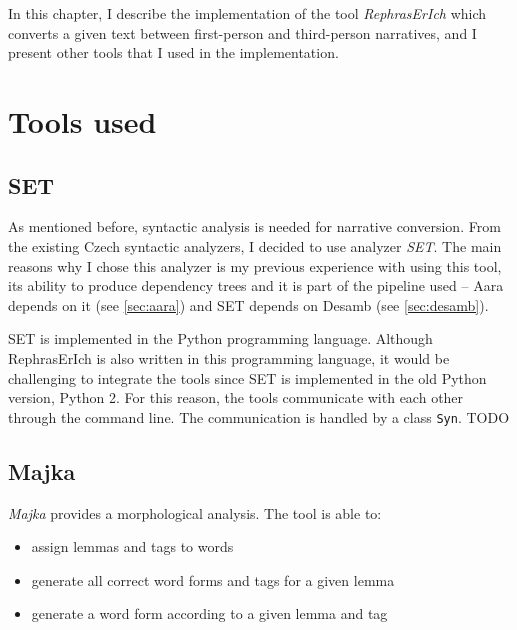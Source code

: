 In this chapter, I describe the implementation of the tool \emph{RephrasErIch} which converts a given text between first-person and third-person narratives, and I present other tools that I used in the implementation.

\section{Tools used} \label{sec:external-tools}

\subsection{SET}

As mentioned before, syntactic analysis is needed for narrative conversion. From the existing Czech syntactic analyzers, I decided to use analyzer \emph{SET}. The main reasons why I chose this analyzer is my previous experience with using this tool, its ability to produce dependency trees and it is part of the pipeline used -- Aara depends on it (see \ref{sec:aara}) and SET depends on Desamb (see \ref{sec:desamb}).

SET is implemented in the Python programming language. Although RephrasErIch is also written in this programming language, it would be challenging to integrate the tools since SET is implemented in the old Python version, Python 2. For this reason, the tools communicate with each other through the command line. The communication is handled by a class \texttt{Syn}.
TODO

\subsection{Majka}

\emph{Majka} \cite{majka} provides a morphological analysis. The tool is able to:
\begin{itemize}
	\item assign lemmas and tags to words
	\item generate all correct word forms and tags for a given lemma
	\item generate a word form according to a given lemma and tag
\end{itemize}

